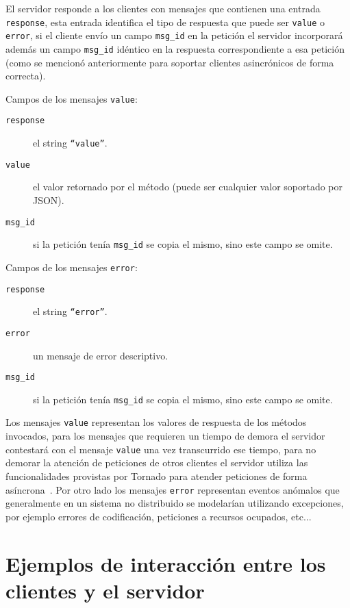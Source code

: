 El servidor responde a los clientes con mensajes que contienen una
entrada \texttt{response}, esta entrada identifica el tipo de respuesta
que puede ser \texttt{value} o \texttt{error}, si el cliente envío un
campo \texttt{msg\_id} en la petición el servidor incorporará además
un campo \texttt{msg\_id} idéntico en la respuesta correspondiente
a esa petición (como se mencionó anteriormente para soportar
clientes asincrónicos de forma correcta).

Campos de los mensajes \texttt{value}:
\begin{description}
    \item[\texttt{response}] el string \texttt{``value''}.
    \item[\texttt{value}] el valor retornado por el método (puede ser
        cualquier valor soportado por JSON).
    \item[\texttt{msg\_id}] si la petición tenía \texttt{msg\_id} se
        copia el mismo, sino este campo se omite.
\end{description}

Campos de los mensajes \texttt{error}:
\begin{description}
    \item[\texttt{response}] el string \texttt{``error''}.
    \item[\texttt{error}] un mensaje de error descriptivo.
    \item[\texttt{msg\_id}] si la petición tenía \texttt{msg\_id} se
        copia el mismo, sino este campo se omite.
\end{description}

Los mensajes \texttt{value} representan los valores de respuesta de
los métodos invocados, para los mensajes que requieren
un tiempo de demora el servidor contestará con el mensaje \texttt{value}
una vez transcurrido ese tiempo, para no demorar la atención de peticiones
de otros clientes el servidor utiliza las funcionalidades provistas por
Tornado para atender peticiones de forma asíncrona~\citep{dory_2012}. Por
otro lado los mensajes \texttt{error} representan eventos anómalos que
generalmente en un sistema no distribuido se modelarían utilizando
excepciones, por ejemplo errores de codificación, peticiones a recursos
ocupados, etc...

\section{Ejemplos de interacción entre los clientes y el servidor}

